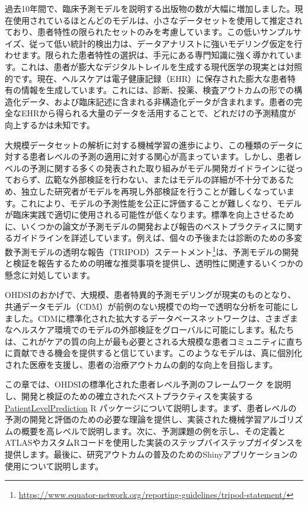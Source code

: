 \documentclass[
  11pt]{book}
\theoremstyle{definition}
\theoremstyle{definition}
\theoremstyle{definition}
\theoremstyle{definition}
\theoremstyle{remark}
\begin{document}
過去10年間で、臨床予測モデルを説明する出版物の数が大幅に増加しました。現在使用されているほとんどのモデルは、小さなデータセットを使用して推定されており、患者特性の限られたセットのみを考慮しています。この低いサンプルサイズ、従って低い統計的検出力は、データアナリストに強いモデリング仮定を行わせます。限られた患者特性の選択は、手元にある専門知識に強く導かれています。これは、患者が膨大なデジタルトレイルを生成する現代医学の現実とは対照的です。現在、ヘルスケアは電子健康記録（EHR）に保存された膨大な患者特有の情報を生成しています。これには、診断、投薬、検査アウトカムの形での構造化データ、および臨床記述に含まれる非構造化データが含まれます。患者の完全なEHRから得られる大量のデータを活用することで、どれだけの予測精度が向上するかは未知です。 

大規模データセットの解析に対する機械学習の進歩により、この種類のデータに対する患者レベルの予測の適用に対する関心が高まっています。しかし、患者レベルの予測に関する多くの発表された取り組みがモデル開発ガイドラインに従っておらず、広範な外部検証を行わない、またはモデルの詳細が不十分であるため、独立した研究者がモデルを再現し外部検証を行うことが難しくなっています。これにより、モデルの予測性能を公正に評価することが難しくなり、モデルが臨床実践で適切に使用される可能性が低くなります。標準を向上させるために、いくつかの論文が予測モデルの開発および報告のベストプラクティスに関するガイドラインを詳述しています。例えば、個々の予後または診断のための多変数予測モデルの透明な報告（TRIPOD）ステートメント\footnote{\url{https://www.equator-network.org/reporting-guidelines/tripod-statement/}}は、予測モデルの開発と検証を報告するための明確な推奨事項を提供し、透明性に関連するいくつかの懸念に対処しています。  

OHDSIのおかげで、大規模、患者特異的予測モデリングが現実のものとなり、共通データモデル（CDM）が前例のない規模での均一で透明な分析を可能にしました。CDMに標準化された拡大するデータベースネットワークは、さまざまなヘルスケア環境でのモデルの外部検証をグローバルに可能にします。私たちは、これがケアの質の向上が最も必要とされる大規模な患者コミュニティに直ちに貢献できる機会を提供すると信じています。このようなモデルは、真に個別化された医療を支援し、患者の治療アウトカムの劇的な向上を目指します。

この章では、OHDSIの標準化された患者レベル予測のフレームワーク \citep{reps2018}を説明し、開発と検証のための確立されたベストプラクティスを実装する \href{https://ohdsi.github.io/PatientLevelPrediction/}{PatientLevelPrediction} R パッケージについて説明します。まず、患者レベルの予測の開発と評価のための必要な理論を提供し、実装された機械学習アルゴリズムの概要を高レベルで説明します。次に、予測課題の例を示し、その定義とATLASやカスタムRコードを使用した実装のステップバイステップガイダンスを提供します。最後に、研究アウトカムの普及のためのShinyアプリケーションの使用について説明します。
\end{document}
